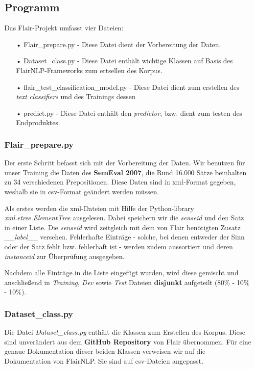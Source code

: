 \documentclass[10pt,a4paper]{article}
\begin{document}
\subsection{Programm}
\begin{flushleft}
Das Flair-Projekt umfasst vier Dateien:
\end{flushleft}
\begin{itemize}
\item[•] Flair\_prepare.py - Diese Datei dient der Vorbereitung der Daten.
\item[•] Dataset\_class.py - Diese Datei enthält wichtige Klassen auf Basis des FlairNLP-Frameworks zum ertsellen des Korpus.
\item[•] flair\_test\_classification\_model.py - Diese Datei dient zum erstellen des \textit{text classifiers} und des Trainings dessen
\item[•] predict.py - Diese Datei enthält den \textit{predictor}, bzw. dient zum testen des Endproduktes.
\end{itemize}

\subsubsection{Flair\_prepare.py}
\begin{flushleft}
Der erste Schritt befasst sich mit der Vorbereitung der Daten. Wir benutzen für unser Training die Daten des \textbf{SemEval 2007}, die Rund 16.000 Sätze beinhalten zu 34 verschiedenen Prepositionen. Diese Daten sind in xml-Format gegeben, weshalb sie in csv-Format geändert werden müssen.

Als erstes werden die xml-Dateien mit Hilfe der Python-library \textit{xml.etree.ElementTree} ausgelesen. Dabei speichern wir die \textit{senseid} und den Satz in einer Liste. Die \textit{senseid} wird zeitgleich mit dem von Flair benötigten Zusatz \textit{\_\_label\_\_} versehen. Fehlerhafte Einträge - solche, bei denen entweder der Sinn oder der Satz fehlt bzw. fehlerhaft ist - werden zudem aussortiert und deren \textit{instanceid} zur Überprüfung ausgegeben.

Nachdem alle Einträge in die Liste eingefügt wurden, wird diese gemischt und anschließend in \textit{Training}, \textit{Dev} sowie \textit{Test} Dateien \textbf{disjunkt} aufgeteilt (80\% - 10\% - 10\%).
\end{flushleft}

\subsubsection{Dataset\_class.py}
\begin{flushleft}
Die Datei \textit{Dataset\_class.py} enthält die Klassen zum Erstellen des Korpus. Diese sind unverändert aus dem \textbf{GitHub Repository} von Flair übernommen. Für eine genaue Dokumentation dieser beiden Klassen verweisen wir auf die Dokumentation von FlairNLP. Sie sind auf csv-Dateien angepasst.
\end{flushleft}
\end{document}

